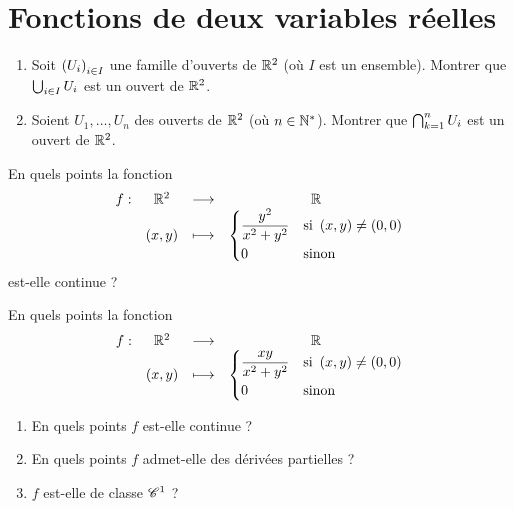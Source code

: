 \chapter{Fonctions de deux variables réelles}

\minitoc

\begin{exo}
\begin{enumerate}
    \item Soit \(\left(U_i\right)_{i\in I}\) une famille d'ouverts de \(\mathbb{R}^2\) (où \(I\) est un ensemble). Montrer que \(\bigcup_{i\in I}U_i\) est un ouvert de \(\mathbb{R}^2\). \\
    \item Soient \(U_1,\dots,U_n\) des ouverts de \(\mathbb{R}^2\) (où \(n\in\mathbb{N}^*\)). Montrer que \(\bigcap_{k=1}^n U_i\) est un ouvert de \(\mathbb{R}^2\).
\end{enumerate}
\end{exo}

\begin{corr}
\end{corr}

\begin{exo}[Exercice 2]
En quels points la fonction \[\begin{array}[t]{cccc}f : & \mathbb{R}^2 & \longrightarrow & \mathbb{R} \\ & \left(x,y\right) & \longmapsto & \begin{dcases}
\dfrac{y^2}{x^2+y^2} &\text{si }\left(x,y\right)\not=\left(0,0\right) \\
0 &\text{sinon}
\end{dcases}\end{array}\] est-elle continue ?
\end{exo}

\begin{corr}
\end{corr}

\begin{exo}[Exercice 3]
En quels points la fonction \[\begin{array}[t]{cccc}f : & \mathbb{R}^2 & \longrightarrow & \mathbb{R} \\ & \left(x,y\right) & \longmapsto & \begin{dcases}
\dfrac{xy}{x^2+y^2} &\text{si }\left(x,y\right)\not=\left(0,0\right) \\
0 &\text{sinon}
\end{dcases}\end{array}\]

\begin{enumerate}
    \item En quels points \(f\) est-elle continue ? \\
    \item En quels points \(f\) admet-elle des dérivées partielles ? \\
    \item \(f\) est-elle de classe \(\mathscr{C}^{1}\) ?
\end{enumerate}
\end{exo}

